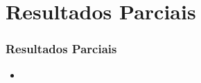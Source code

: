 \section{Resultados Parciais}

\begin{frame}\frametitle{Resultados Parciais} 
\begin{itemize}
	\item 
\end{itemize}	
\end{frame}